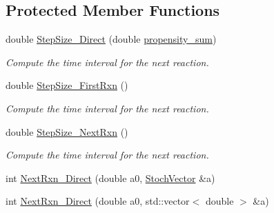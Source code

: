 \subsection*{Protected Member Functions}
\begin{CompactItemize}
\item 
double \hyperlink{class_s_s_a_cf4d8a1bce824e370003474bacc5e2f9}{StepSize\_\-Direct} (double \hyperlink{class_base_system_ef2522788abb1430d6d55bfdd0b15a0b}{propensity\_\-sum})
\begin{CompactList}\small\item\em Compute the time interval for the next reaction. \item\end{CompactList}\item 
double \hyperlink{class_s_s_a_7b31f6f4b15ffce1776ae6f32474935a}{StepSize\_\-FirstRxn} ()
\begin{CompactList}\small\item\em Compute the time interval for the next reaction. \item\end{CompactList}\item 
double \hyperlink{class_s_s_a_a379c7b468dc654e687500f4ee6894d7}{StepSize\_\-NextRxn} ()
\begin{CompactList}\small\item\em Compute the time interval for the next reaction. \item\end{CompactList}\item 
int \hyperlink{class_s_s_a_3c77e51c6509a514a8cd513fd014d974}{NextRxn\_\-Direct} (double a0, \hyperlink{class_stoch_vector}{StochVector} \&a)
\item 
int \hyperlink{class_s_s_a_95c1dc3e657f3e8c5f2299f4f5973461}{NextRxn\_\-Direct} (double a0, std::vector$<$ double $>$ \&a)
\end{CompactItemize}
